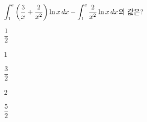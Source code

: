 \hspace*{2mm}\begin{minipage}[t]{\dimexpr\linewidth-2mm\relax}\vspace{0pt}
$\displaystyle\int_{1}^{e}\left(\dfrac{3}{x}+\dfrac{2}{x^2}\right)\ln x\mkern3mu dx-\int_{1}^{e}\dfrac{2}{x^2}\ln x\mkern3mu dx$의 값은?
\begin{choices32}{\rule[-3ex]{0pt}{8ex}$\dfrac{1}{2}$}{\rule[-3ex]{0pt}{8ex}$1$}{\rule[-3ex]{0pt}{8ex}$\dfrac{3}{2}$}{\rule[-3ex]{0pt}{8ex}$2$}{\rule[-3ex]{0pt}{8ex}$\dfrac{5}{2}$}\end{choices32}\end{minipage}
